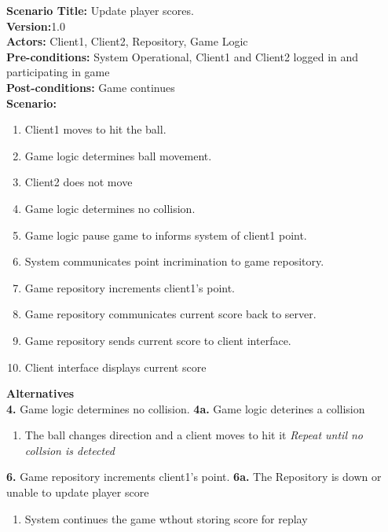 \documentclass[letterpaper,12pt]{article}
\begin{document}
\noindent \textbf{Scenario Title:} Update player scores.\\
\textbf{Version:}1.0\\
\textbf{Actors:} Client1, Client2, Repository, Game Logic\\
\textbf{Pre-conditions:} System Operational, Client1 and Client2 logged in and participating in game \\
\textbf{Post-conditions:} Game continues\\
\textbf{Scenario:}
\begin{enumerate}
\item Client1 moves to hit the ball.
\item Game logic determines ball movement.
\item Client2 does not move 
\item Game logic determines no collision. 
\item Game logic pause game to informs system of client1 point.
\item System communicates point incrimination to game repository.
\item Game repository increments client1’s point.
\item Game repository communicates current score back to server.
\item Game repository sends current score to client interface.
\item Client interface displays current score
\end{enumerate}
\textbf{Alternatives}\\
\textbf{4.} Game logic determines no collision. 
\textbf{4a.} Game logic deterines a collision
\begin {enumerate}
\item The ball changes direction and a client moves to hit it
\emph {Repeat until no collsion is detected}
\end {enumerate}
\textbf{6.} Game repository increments client1’s point.
\textbf{6a.} The Repository is down or unable to update player score
\begin{enumerate}
\item System continues the game wthout storing score for replay
\end{enumerate}
\end{document}
